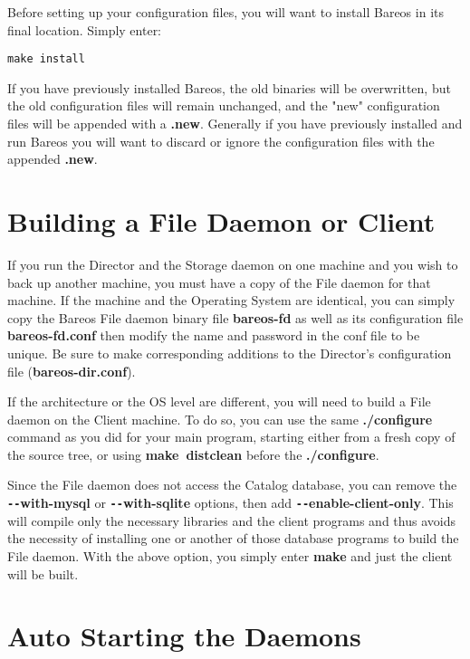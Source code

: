 Before setting up your configuration files, you will want to install Bareos in
its final location. Simply enter:

\footnotesize
\begin{verbatim}
make install
\end{verbatim}
\normalsize

If you have previously installed Bareos, the old binaries will be overwritten,
but the old configuration files will remain unchanged, and the "new"
configuration files will be appended with a {\bf .new}. Generally if you have
previously installed and run Bareos you will want to discard or ignore the
configuration files with the appended {\bf .new}.

\section{Building a File Daemon or Client}

If you run the Director and the Storage daemon on one machine and you wish to
back up another machine, you must have a copy of the File daemon for that
machine. If the machine and the Operating System are identical, you can simply
copy the Bareos File daemon binary file {\bf bareos-fd} as well as its
configuration file {\bf bareos-fd.conf} then modify the name and password in
the conf file to be unique. Be sure to make corresponding additions to the
Director's configuration file ({\bf bareos-dir.conf}).

If the architecture or the OS level are different, you will need to build a
File daemon on the Client machine. To do so, you can use the same {\bf
./configure} command as you did for your main program, starting either from a
fresh copy of the source tree, or using {\bf make\ distclean} before the {\bf
./configure}.

Since the File daemon does not access the Catalog database, you can remove
the {\bf \verb:--:with-mysql} or {\bf \verb:--:with-sqlite} options, then
add {\bf \verb:--:enable-client-only}.  This will compile only the
necessary libraries and the client programs and thus avoids the necessity
of installing one or another of those database programs to build the File
daemon.  With the above option, you simply enter {\bf make} and just the
client will be built.

\label{autostart}
\section{Auto Starting the Daemons}

